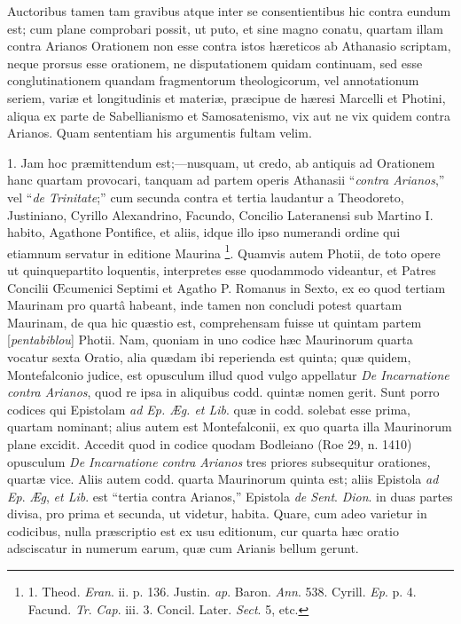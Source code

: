 Auctoribus
tamen tam gravibus atque inter se consentientibus hic contra eundum
est; cum plane comprobari possit, ut puto, et sine magno conatu,
quartam illam contra Arianos Orationem non esse contra istos hæreticos
ab Athanasio scriptam, neque prorsus esse orationem, ne disputationem
quidam continuam, sed esse conglutinationem quandam fragmentorum
theologicorum, vel annotationum seriem, variæ et longitudinis et
materiæ, præcipue de hæresi Marcelli et Photini, aliqua ex parte
de Sabellianismo et Samosatenismo, vix aut ne vix quidem contra
Arianos. Quam sententiam his argumentis fultam velim.


1.
Jam hoc præmittendum est;—nusquam, ut credo, ab antiquis ad
Orationem hanc quartam provocari, tanquam ad partem operis Athanasii ``\emph{contra
Arianos},'' vel ``\emph{de Trinitate};'' cum secunda contra et tertia
laudantur a Theodoreto, Justiniano, Cyrillo Alexandrino, Facundo,
Concilio Lateranensi sub Martino I. habito, Agathone Pontifice, et
aliis, idque illo ipso numerandi ordine qui etiamnum servatur in
editione Maurina \footnote{1.
Theod. \emph{Eran}. ii. p. 136. Justin. \emph{ap}. Baron. \emph{Ann}.
538. Cyrill. \emph{Ep}. p. 4. Facund. \emph{Tr}. \emph{Cap}. iii. 3.
Concil. Later. \emph{Sect}. 5, etc.}. Quamvis
autem Photii, de toto opere ut quinquepartito loquentis, interpretes
esse quodammodo videantur, et Patres Concilii Œcumenici Septimi et
Agatho P. Romanus in Sexto, ex eo quod tertiam Maurinam pro quartâ
habeant, inde tamen non concludi potest quartam Maurinam, de qua hic quæstio est, comprehensam fuisse ut quintam partem [\emph{pentabiblou}]
Photii. Nam, quoniam in uno codice hæc Maurinorum quarta vocatur
sexta Oratio, alia quædam ibi reperienda est quinta; quæ quidem,
Montefalconio judice, est opusculum illud quod vulgo appellatur \emph{De
Incarnatione contra Arianos}, quod re ipsa in aliquibus codd. quintæ
nomen gerit. Sunt porro codices qui Epistolam \emph{ad Ep. Æg. et Lib}.
quæ in codd. solebat esse prima, quartam nominant;
alius autem est Montefalconii, ex quo quarta illa Maurinorum plane
excidit. Accedit quod in codice quodam Bodleiano (Roe 29, n. 1410)
opusculum \emph{De Incarnatione contra Arianos} tres priores
subsequitur orationes, quartæ vice. Aliis autem codd. quarta
Maurinorum quinta est; aliis Epistola \emph{ad Ep}. \emph{Æg}, \emph{et
Lib}. est ``tertia contra Arianos,'' Epistola \emph{de Sent}. \emph{Dion}.
in duas partes divisa, pro prima et secunda, ut videtur, habita. Quare,
cum adeo varietur in codicibus, nulla præscriptio est ex usu
editionum, cur quarta hæc oratio adsciscatur in numerum earum, quæ
cum Arianis bellum gerunt.

